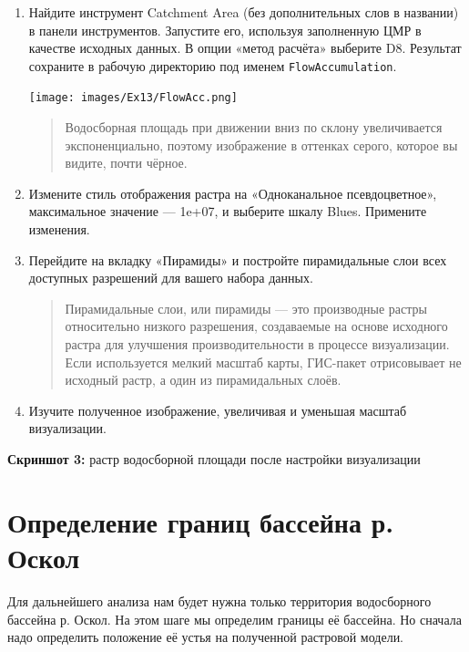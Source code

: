 \documentclass[
  12pt,
]{book}
\begin{document}
\begin{enumerate}
\def\labelenumi{\arabic{enumi}.}
\item
  Найдите инструмент Catchment Area (без дополнительных слов в названии) в панели инструментов. Запустите его, используя заполненную ЦМР в качестве исходных данных. В опции «метод расчёта» выберите D8. Результат сохраните в рабочую директорию под именем \texttt{FlowAccumulation}.

  \texttt{[image: images/Ex13/FlowAcc.png]}

  \begin{quote}
  Водосборная площадь при движении вниз по склону увеличивается экспоненциально, поэтому изображение в оттенках серого, которое вы видите, почти чёрное.
  \end{quote}
\item
  Измените стиль отображения растра на «Одноканальное псевдоцветное», максимальное значение --- 1e+07, и выберите шкалу Blues. Примените изменения.
\item
  Перейдите на вкладку «Пирамиды» и постройте пирамидальные слои всех доступных разрешений для вашего набора данных.

  \begin{quote}
  Пирамидальные слои, или пирамиды --- это производные растры относительно низкого разрешения, создаваемые на основе исходного растра для улучшения производительности в процессе визуализации. Если используется мелкий масштаб карты, ГИС-пакет отрисовывает не исходный растр, а один из пирамидальных слоёв.
  \end{quote}
\item
  Изучите полученное изображение, увеличивая и уменьшая масштаб визуализации.
\end{enumerate}

\textbf{Скриншот 3:} растр водосборной площади после настройки визуализации

\hypertarget{hydrodem-basin}{%
\section{Определение границ бассейна р. Оскол}\label{hydrodem-basin}}

Для дальнейшего анализа нам будет нужна только территория водосборного бассейна р. Оскол. На этом шаге мы определим границы её бассейна. Но сначала надо определить положение её устья на полученной растровой модели.
\end{document}
